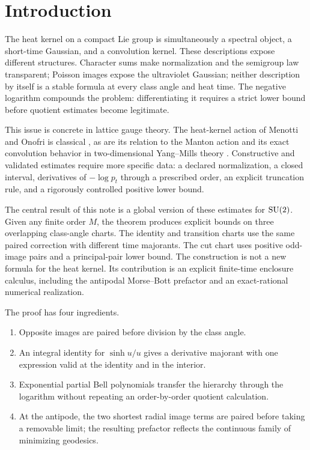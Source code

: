 \section{Introduction}

The heat kernel on a compact Lie group is simultaneously a spectral object, a
short-time Gaussian, and a convolution kernel.  These descriptions expose
different structures.  Character sums make normalization and the semigroup
law transparent; Poisson images expose the ultraviolet Gaussian; neither
description by itself is a stable formula at every class angle and heat time.
The negative logarithm compounds the problem: differentiating it requires a
strict lower bound before quotient estimates become legitimate.

This issue is concrete in lattice gauge theory.  The heat-kernel action of
Menotti and Onofri is classical \cite{MenottiOnofri1981}, as are its relation
to the Manton action \cite{Manton1980} and its exact convolution behavior in
two-dimensional Yang--Mills theory \cite{GrossKingSengupta1989,Sengupta1993}.
Constructive and validated estimates require more specific data: a declared
normalization, a closed interval, derivatives of $-\log p_t$ through a
prescribed order, an explicit truncation rule, and a rigorously controlled
positive lower bound.

The central result of this note is a global version of these estimates for
$\mathrm{SU}(2)$.  Given any finite order $M$, the theorem produces explicit bounds on
three overlapping class-angle charts.  The identity and transition charts
use the same paired correction with different time majorants.  The cut chart
uses positive odd-image pairs and a principal-pair lower bound.  The
construction is not a new formula for the heat kernel.  Its contribution is
an explicit finite-time enclosure calculus, including the antipodal
Morse--Bott prefactor and an exact-rational numerical realization.

The proof has four ingredients.
\begin{enumerate}[label=(\roman*)]
\item Opposite images are paired before division by the class angle.
\item An integral identity for $\sinh u/u$ gives a derivative majorant with
  one expression valid at the identity and in the interior.
\item Exponential partial Bell polynomials transfer the hierarchy through the
  logarithm without repeating an order-by-order quotient calculation.
\item At the antipode, the two shortest radial image terms are paired before
  taking a removable limit; the resulting prefactor reflects the continuous
  family of minimizing geodesics.
\end{enumerate}

